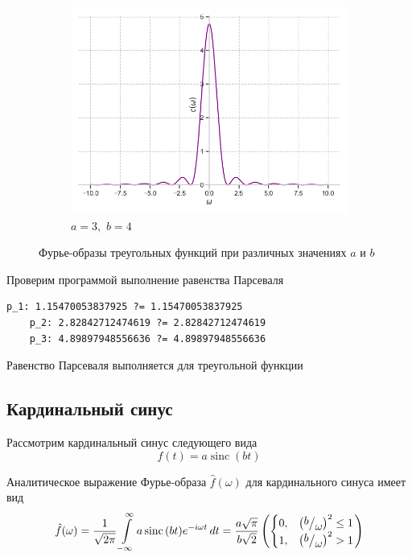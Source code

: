 \documentclass[a4paper, 16pt]{article}
\DeclareMathOperator{\sinc}{sinc}
\newcommand{\frc}[2]{\raisebox{2pt}{$#1$}\big/\raisebox{-3pt}{$#2$}}
\begin{document}
\begin{figure}[htbp]
\begin{subfigure}{0.3\textwidth}
            \centering
            \includegraphics[width=\linewidth]{trifimg_a=3_b=4.png}
            \caption{$a=3,\,\,b=4$}
            \label{fig:trifimg_3}
        \end{subfigure}
        \caption{Фурье-образы треугольных функций при различных значениях $a$ и $b$}
        \label{fig:trifimgs}
    \end{figure}


    \newpage
    \noindent Проверим программой выполнение равенства Парсеваля
    \begin{lstlisting}[label=parstrif, caption=Равенство Парсеваля для треугольных функций]
    p_1: 1.15470053837925 ?= 1.15470053837925
    p_2: 2.82842712474619 ?= 2.82842712474619
    p_3: 4.89897948556636 ?= 4.89897948556636
    \end{lstlisting}


    \noindent Равенство Парсеваля выполняется для треугольной функции


    \subsection{Кардинальный синус}
    \noindent Рассмотрим кардинальный синус следующего вида
    $$
    f(t)=a\sinc{(bt)}
    $$


    \noindent Аналитическое выражение Фурье-образа $\hat{f}(\omega)$ для кардинального синуса
    имеет вид
    $$
    \hat{f}(\omega)=\dfrac{1}{\sqrt{2\pi}}\int\limits_{-\infty}^{\infty}a\sinc{(bt)}e^{-i\omega t}\,dt=\dfrac{a\sqrt{\pi}}{b\sqrt{2}}
    \left(
        \begin{cases}
            0, & \left(\frc{b}{\omega}\right)^{2}\leq 1\\
            1, & \left(\frc{b}{\omega}\right)^{2}>1
        \end{cases}
    \right)
    $$
\end{document}

